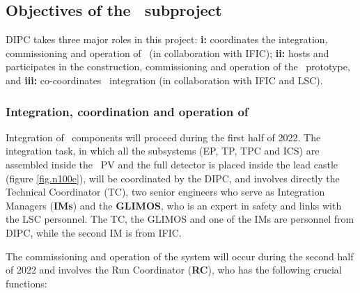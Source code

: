 \subsection{Objectives of the \sDIPC\ subproject}
\label{sec.obj.dipc}

DIPC takes three major roles in this project: {\bf i:} coordinates the integration, commissioning and operation of \Next\ (in collaboration with IFIC); 
{\bf ii:} hosts and participates in the construction, commissioning and operation of the \HDEMO\ prototype, and 
{\bf iii:} co-coordinates \NHD\ integration (in collaboration with IFIC and LSC). 

   
\subsubsection*{Integration, coordination and operation of \Next}

\indent

%

Integration of \Next\ components will proceed during the first half of 2022. The integration task, in which all the subsystems (EP, TP, TPC and ICS) are assembled inside the \Next\ PV and the full detector is placed inside the lead castle (figure \ref{fig.n100e}), will be coordinated by the DIPC, and involves directly the Technical Coordinator (TC), two senior engineers who serve as Integration Managers ({\bf IMs}) and the {\bf GLIMOS}, who is an expert in safety and links with the LSC personnel. The TC, the GLIMOS and one of the IMs are personnel from DIPC, while the second IM is from IFIC. 

The commissioning and operation of the system will occur during the second half of 2022 and involves the Run Coordinator ({\bf RC}), who has the following crucial functions: 


\indent

